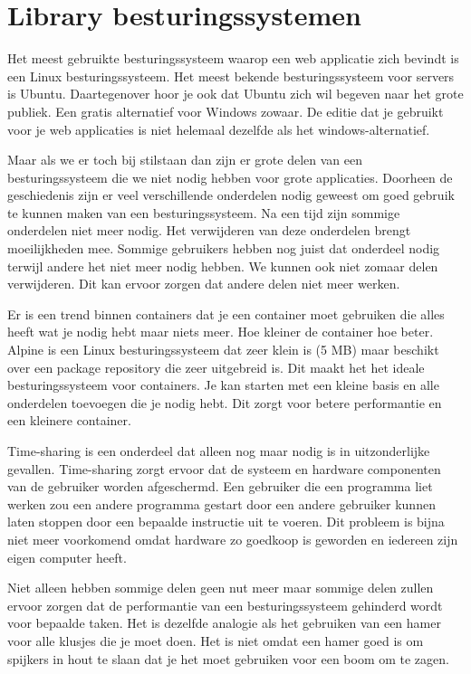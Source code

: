 \documentclass[pdftex,a4paper,12pt,twoside]{report}
\begin{document}
\section{Library besturingssystemen}

Het meest gebruikte besturingssysteem waarop een web applicatie zich bevindt is een Linux besturingssysteem. Het meest bekende besturingssysteem voor servers is Ubuntu. Daartegenover hoor je ook dat Ubuntu zich wil begeven naar het grote publiek. Een gratis alternatief voor Windows zowaar. De editie dat je gebruikt voor je web applicaties is niet helemaal dezelfde als het windows-alternatief. 

Maar als we er toch bij stilstaan dan zijn er grote delen van een besturingssysteem die we niet nodig hebben voor grote applicaties. Doorheen de geschiedenis zijn er veel verschillende onderdelen nodig geweest om goed gebruik te kunnen maken van een besturingssysteem. Na een tijd zijn sommige onderdelen niet meer nodig. Het verwijderen van deze onderdelen brengt moeilijkheden mee. Sommige gebruikers hebben nog juist dat onderdeel nodig terwijl andere het niet meer nodig hebben. We kunnen ook niet zomaar delen verwijderen. Dit kan ervoor zorgen dat andere delen niet meer werken. 

Er is een trend binnen containers dat je een container moet gebruiken die alles heeft wat je nodig hebt maar niets meer. Hoe kleiner de container hoe beter. Alpine is een Linux besturingssysteem dat zeer klein is (5 MB) maar beschikt over een package repository die zeer uitgebreid is. Dit maakt het het ideale besturingssysteem voor containers. Je kan starten met een kleine basis en alle onderdelen toevoegen die je nodig hebt. Dit zorgt voor betere performantie en een kleinere container.

 Time-sharing is een onderdeel dat alleen nog maar nodig is in uitzonderlijke gevallen. Time-sharing zorgt ervoor dat de systeem en hardware componenten van de gebruiker worden afgeschermd. Een gebruiker die een programma liet werken zou een andere programma gestart door een andere gebruiker kunnen laten stoppen door een bepaalde instructie uit te voeren. Dit probleem is bijna niet meer voorkomend omdat hardware zo goedkoop is geworden en iedereen zijn eigen computer heeft.

Niet alleen hebben sommige delen geen nut meer maar sommige delen zullen ervoor zorgen dat de performantie van een besturingssysteem gehinderd wordt voor bepaalde taken. Het is dezelfde analogie als het gebruiken van een hamer voor alle klusjes die je moet doen. Het is niet omdat een hamer goed is om spijkers in hout te slaan dat je het moet gebruiken voor een boom om te zagen. 
\end{document}
